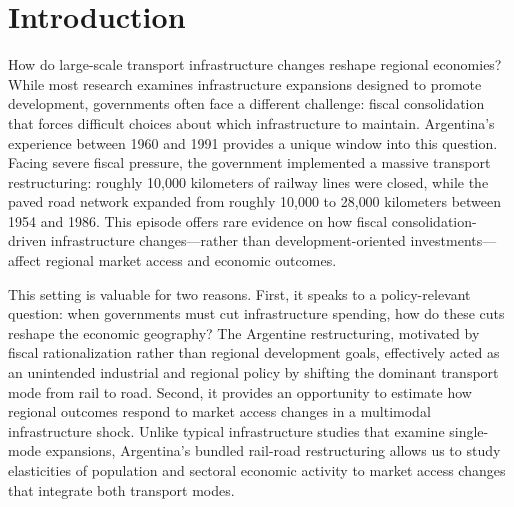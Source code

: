 %
%

\section{Introduction}
\label{sec:intro}

How do large-scale transport infrastructure changes reshape regional
economies? While most research examines infrastructure expansions
designed to promote development, governments often face a different
challenge: fiscal consolidation that forces difficult choices about
which infrastructure to maintain. Argentina's experience between 1960
and 1991 provides a unique window into this question. Facing severe
fiscal pressure, the government implemented a massive transport
restructuring: roughly 10{,}000 kilometers of railway lines were
closed, while the paved road network expanded from roughly 10{,}000
to 28{,}000 kilometers between 1954 and 1986. This episode offers
rare evidence on how fiscal consolidation-driven infrastructure
changes—rather than development-oriented investments—affect regional
market access and economic outcomes.

This setting is valuable for two reasons. First, it speaks to a
policy-relevant question: when governments must cut infrastructure
spending, how do these cuts reshape the economic geography? The
Argentine restructuring, motivated by fiscal rationalization rather
than regional development goals, effectively acted as an unintended
industrial and regional policy by shifting the dominant transport
mode from rail to road. Second, it provides an opportunity to estimate
how regional outcomes respond to market access changes in a multimodal
infrastructure shock. Unlike typical infrastructure studies that
examine single-mode expansions, Argentina's bundled rail-road
restructuring allows us to study elasticities of population and
sectoral economic activity to market access changes that integrate
both transport modes.

